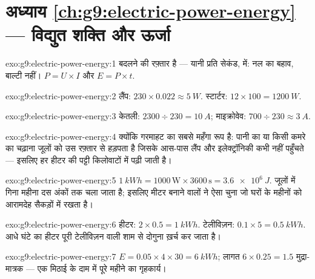\section*{अध्याय \ref{ch:g9:electric-power-energy} --- विद्युत शक्ति और ऊर्जा}

\begin{solution}{exo:g9:electric-power-energy:1}
  बदलने की रफ़्तार है --- यानी  प्रति सेकंड,  में: नल
का बहाव, बाल्टी नहीं। $P = U \times I$ और $E = P \times t$.
\end{solution}

\begin{solution}{exo:g9:electric-power-energy:2}
लैंप: $230 \times 0.022 \approx \qty{5}{W}$. स्टार्टर: $12 \times 100
= \qty{1200}{W}$.
\end{solution}

\begin{solution}{exo:g9:electric-power-energy:3}
केतली: $2300 \div 230 = \qty{10}{A}$; माइक्रोवेव: $700 \div 230
\approx \qty{3}{A}$.
\end{solution}

\begin{solution}{exo:g9:electric-power-energy:4}
क्योंकि गरमाहट  का सबसे महँगा रूप है: पानी का या किसी कमरे का 
चढ़ाना जूलों को उस रफ़्तार से हड़पता है जिसके आस-पास लैंप और
इलेक्ट्रॉनिकी कभी नहीं पहुँचते --- इसलिए हर हीटर की पट्टी किलोवाटों में
पढ़ी जाती है।
\end{solution}

\begin{solution}{exo:g9:electric-power-energy:5}
$\qty{1}{kWh} = 1000 \, \text{W} \times 3600 \, \text{s} =
\qty{3.6e6}{J}$. जूलों में गिना महीना दस अंकों तक चला जाता है; इसलिए
मीटर बनाने वालों ने ऐसा  चुना जो घरों के महीनों को आरामदेह
सैकड़ों में रखता है।
\end{solution}

\begin{solution}{exo:g9:electric-power-energy:6}
हीटर: $2 \times 0.5 = \qty{1}{kWh}$. टेलीविज़न: $0.1 \times 5 =
\qty{0.5}{kWh}$. आधे घंटे का हीटर पूरी टेलीविज़न वाली शाम से दोगुना
ख़र्च कर जाता है।
\end{solution}

\begin{solution}{exo:g9:electric-power-energy:7}
$E = 0.05 \times 4 \times 30 = \qty{6}{kWh}$; लागत $6 \times 0.25 =
1.5$ मुद्रा-मात्रक --- एक मिठाई के दाम में पूरे महीने का गृहकार्य।
\end{solution}

